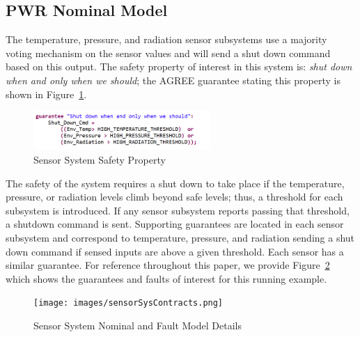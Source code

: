 \subsection{PWR Nominal Model}
The temperature, pressure, and radiation sensor subsystems use a majority voting mechanism on the sensor values and will send a shut down command based on this output. The safety property of interest in this system is: \emph{shut down when and only when we should}; the AGREE guarantee stating this property is shown in Figure~\ref{fig:shutdownGuar}. 

\begin{figure}[h!]
	\begin{center}
		\includegraphics[width=0.6\textwidth]{images/sensorGuar.PNG}
	\end{center}
	\vspace{-2em}
	\caption{Sensor System Safety Property}
	\label{fig:shutdownGuar}
\end{figure}

The safety of the system requires a shut down to take place if the temperature, pressure, or radiation levels climb beyond safe levels; thus, a threshold for each subsystem is introduced. If any sensor subsystem reports passing that threshold, a shutdown command is sent. Supporting guarantees are located in each sensor subsystem and correspond to temperature, pressure, and radiation sending a shut down command if sensed inputs are above a given threshold. Each sensor has a similar guarantee. For reference throughout this paper, we provide Figure~\ref{fig:sensorSysContracts} which shows the guarantees and faults of interest for this running example. 

\begin{figure}[h!]
	\begin{center}
		\texttt{[image: images/sensorSysContracts.png]}
	\end{center}
	\vspace{-2em}
	\caption{Sensor System Nominal and Fault Model Details}
	\label{fig:sensorSysContracts}
\end{figure}

